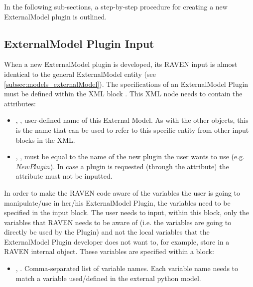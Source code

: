 In the following sub-sections, a step-by-step procedure for creating a new ExternalModel plugin is outlined.

\subsection{ExternalModel Plugin Input}
\label{subsec:externalModelPluginInput}
When a new ExternalModel plugin is developed, its RAVEN input is almost identical
to the general ExternalModel entity (see \ref{subsec:models_externalModel}).
The specifications of an ExternalModel Plugin must be defined within the XML block
.
%
This XML node needs to contain the attributes:

\vspace{-5mm}
\begin{itemize}
  \itemsep0em
  \item {}, , user-defined name
  of this External Model.
  \nb As with the other objects, this is the name that can be used to refer to
  this specific entity from other input blocks in the XML.
  \item {}, , must be equal to the
  name of the new plugin the user wants to use (e.g. $NewPlugin$).
  \nb In case a plugin is requested (through the   attribute) the
  attribute  must not be inputted.
\end{itemize}
\vspace{-5mm}

In order to make the RAVEN code aware of the variables the user is going to
manipulate/use in her/his ExternalModel Plugin, the variables need to be specified
in the  input block.
%
The user needs to input, within this block, only the variables that RAVEN needs
to be aware of (i.e. the variables are going to directly be used by the Plugin)
and not the local variables that the ExternalModel Plugin developer does not want to,
for example, store in a RAVEN internal object.
%
These variables are specified within a  block:
\begin{itemize}
  \item {}, .
  Comma-separated list of variable names.
  Each variable name needs to match a variable used/defined in the external python
  model.
\end{itemize}

